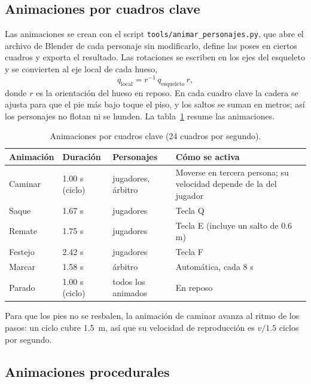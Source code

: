 \documentclass[12pt,letterpaper]{article}
\begin{document}
\subsection{Animaciones por cuadros clave}
Las animaciones se crean con el script \texttt{tools/animar\_personajes.py}, que abre el
archivo de Blender de cada personaje sin modificarlo, define las poses en ciertos cuadros y
exporta el resultado. Las rotaciones se escriben en los ejes del esqueleto y se convierten al
eje local de cada hueso,
\begin{equation}
  q_{\text{local}} = r^{-1}\, q_{\text{esqueleto}}\, r,
\end{equation}
donde $r$ es la orientación del hueso en reposo. En cada cuadro clave la cadera se ajusta
para que el pie más bajo toque el piso, y los saltos se suman en metros; así los personajes
no flotan ni se hunden. La tabla~\ref{tab:keyframes} resume las animaciones.

\begin{table}[H]
  \centering
  \caption{Animaciones por cuadros clave (24 cuadros por segundo).}
  \label{tab:keyframes}
  \begin{tabularx}{\linewidth}{l l l X}
    \toprule
    \textbf{Animación} & \textbf{Duración} & \textbf{Personajes} & \textbf{Cómo se activa} \\
    \midrule
    Caminar  & 1.00 s (ciclo) & jugadores, árbitro & Moverse en tercera persona; su velocidad depende de la del jugador \\
    Saque    & 1.67 s & jugadores & Tecla Q \\
    Remate   & 1.75 s & jugadores & Tecla E (incluye un salto de 0.6 m) \\
    Festejo  & 2.42 s & jugadores & Tecla F \\
    Marcar   & 1.58 s & árbitro   & Automática, cada 8 s \\
    Parado   & 1.00 s (ciclo) & todos los animados & En reposo \\
    \bottomrule
  \end{tabularx}
\end{table}

Para que los pies no se resbalen, la animación de caminar avanza al ritmo de los pasos: un
ciclo cubre 1.5~m, así que su velocidad de reproducción es $v / 1.5$ ciclos por segundo.

\subsection{Animaciones procedurales}
\end{document}

